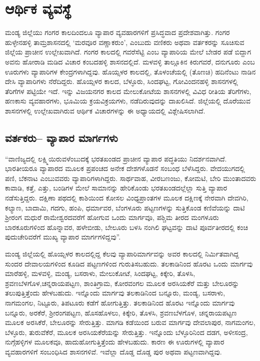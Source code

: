 
\chapter{ಆರ್ಥಿಕ ವ್ಯವಸ್ಥೆ}

ಮಂಡ್ಯ ಜಿಲ್ಲೆಯು ಗಂಗರ ಕಾಲದಿಂದಲೂ ವ್ಯಾಪಾರ ವ್ಯವಹಾರಗಳಿಗೆ ಪ್ರಸಿದ್ಧವಾದ ಪ್ರದೇಶವಾಗಿತ್ತು. ಗಂಗರ ಹುಳ್ಳೇನಹಳ್ಳಿ ತಾಮ್ರಶಾಸನದಲ್ಲಿ ‘ಮರವೂರ ವಣ್ಣಾಕರುಂ’, ಎಂಬುದು ವಣಿಕರು ಅಥವಾ ವರ್ತಕರನ್ನು ಸೂಚಿಸುವ ಜಿಲ್ಲೆಯ ಪ್ರಾಚೀನ ಉಲ್ಲೇಖವಾಗಿದೆ. ಗಂಗರ ಕಾಲದಲ್ಲಿ ಗವರೆಸೆಟ್ಟಿ ಎಂಬ ವ್ಯಾಪಾರಿಯ ಮೇಲೆ ಬೇಡರ ಪಡೆ ಬಿದ್ದಾಗ ಅವನು ಹೋರಾಡಿ ಮಡಿದ ವಿಚಾರ ಕಂಬದಹಳ್ಳಿ ಶಾಸನದಲ್ಲಿದೆ. ಮಳವಳ್ಳಿ ತಾಲ್ಲೂಕಿನ ಕಿರುಗವರೆ, ದನುಗೂರು ಎಂಬ ಊರುಗಳು ವ್ಯಾಪಾರಿಗಳ ಕೇಂದ್ರಗಳಾಗಿದ್ದವು. ಹೊಯ್ಸಳರ ಕಾಲದಲ್ಲಿ, ತೊಳಂಚೆಯಲ್ಲಿ (ತೊಣಚಿ) ಹದಿನೆಂಟು ನಾಡಿನ ದೇಸಿ ವ್ಯಾಪಾರಿಗಳು ನೆರೆದಿದ್ದರು. ಹೊಯ್ಸಳರ ಕಾಲದ, ಬೆಳ್ಳೂರು, ಸಿಂದಘಟ್ಟ, ಗೋವಿಂದನಹಳ್ಳಿ ಶಾಸನಗಳಲ್ಲಿ ತೆರಿಗೆಗಳ ಪಟ್ಟಿಯೇ ಇದೆ. ಇನ್ನು ವಿಜಯನಗರ ಕಾಲದ ಮೇಲುಕೋಟೆಯ ಶಾಸನಗಳಲ್ಲಿ ವಿವಿಧ ರೀತಿಯ ತೆರಿಗೆಗಳು, ಹಣಕಾಸು ವ್ಯವಹಾರಗಳು, ಭೂಮಿಯ ಕ್ರಯವಿಕ್ರಯಗಳು, ನಡೆದಿರುವುದನ್ನು ದಾಖಲಿಸಿದೆ. ಜಿಲ್ಲೆಯಲ್ಲಿ ದೊರೆಯುವ ಶಾಸನಗಳಲ್ಲಿ ಉಲ್ಲೇಖವಾಗಿರುವ ಆರ್ಥಿಕ ವಿಚಾರಗಳನ್ನು ಈ ಅಧ್ಯಾಯದಲ್ಲಿ ವಿಶ್ಲೇಷಿಸಲಾಗಿದೆ.

\section{ವರ್ತಕರು– ವ್ಯಾಪಾರ ಮಾರ್ಗಗಳು}

“ವಾಣಿಜ್ಯದಲ್ಲಿ ಲಕ್ಷ್ಮಿಯಿರುವಳೆಂಬುದಕ್ಕೆ ಭರತಖಂಡದ ಪ್ರಾಚೀನ ವ್ಯಾಪಾರ ಪದ್ಧತಿಯು ನಿದರ್ಶನವಾಗಿದೆ. ಭಾರತೀಯರೂ ವ್ಯಾಪಾರದ ಮೂಲಕ ಪ್ರಪಂಚದ ಅನೇಕ ದೇಶಗಳೊಡನೆ ಸಂಬಂಧ ಬೆಳೆಸಿದ್ದರು. ವೇದಯುಗದಲ್ಲಿ ಪಣಿ, ಬೆಕನಾಟ ಎಂಬುವವರು ವ್ಯಾಪಾರಿಗಳಾಗಿದ್ದರು. ಸಾರ್ಥವಾಹ, ವೀರಬಣಂಜು, ಕೋಮಟಿ, ಬೇರಿ ಮುಂತಾದವರು ಕಾವಾಡಿ, ಕತ್ತೆ, ಎತ್ತು, ಬಂಡಿಗಳ ಮೇಲೆ ಸಾಮಾನನ್ನು ಹೇರಿಕೊಂಡು ಭರತಖಂಡದಲ್ಲೆಲ್ಲಾ ಸುತ್ತಿ ವ್ಯಾಪಾರ ನಡೆಸುತ್ತಿದ್ದರು. ದಕ್ಷಿಣಾ ಪಥದಲ್ಲಿ ಕಾಶಿಯಿಂದ ಕೋಸಲ ವಿಂಧ್ಯಪ್ರಾಂತಗಳ ಮೂಲಕ ದಕ್ಷಿಣಕ್ಕೆ ನೇರವಾಗಿ ದೇವಗಿರಿ, ಕಲ್ಯಾಣ, ಬಾದಾಮಿ, ಗದಗು, ಹಂಪಿ, ಧರ್ಮಾವರ, ಬೆಂಗಳೂರು ಪಟ್ಟಣಗಳನ್ನು ಸುತ್ತಿಕೊಂಡ ಕಣಿವೆಯನ್ನು ದಾಟಿ ಶ‍್ರೀರಂಗ ಮಧುರೆ ರಾಮೇಶ್ವರದವರೆಗೆ ಹೋಗುವ ಒಂದು ಮಾರ್ಗವೂ, ಪಶ್ಚಿಮ ತೀರದ ಮಂಗಳೂರು ಬಾರಕೂರುಗಳಿಂದ ಹೊನ್ನಾವರ, ಹಳೇಬೀಡು, ಬೇಲೂರು ಬಳಸಿ ನಂಗಿಲಿ ಘಟ್ಟವನ್ನು ದಾಟಿ ಪೂರ್ವತೀರದಲ್ಲಿ ಕಂಚಿ ಪುದುಚೇರಿವರೆಗೆ ಮುಖ್ಯ ವ್ಯಾಪಾರ ಮಾರ್ಗಗಳಿದ್ದವು”.

ಮಂಡ್ಯ ಜಿಲ್ಲೆಯಲ್ಲಿ ಹೊಯ್ಸಳರ ಕಾಲದಲ್ಲಿದ್ದ ಕೆಲವು ವ್ಯಾಪಾರಿಮಾರ್ಗವನ್ನು ಅವರ ಕಾಲದಲ್ಲಿ ನಿರ್ಮಿತವಾಗಿದ್ದ ಸುಂದರ ದೇವಾಲಯಗಳಿಂದ ಕೂಡಿದ ಪಟ್ಟಣಗಳಿಂದ ಗುರುತಿಸಬಹುದು. ತಲಕಾಡಿನಿಂದ ಹೊರಟ ಒಂದು ಮಾರ್ಗವು ಮಾರೆಹಳ್ಳಿ, ಮಳವಳ್ಳಿ, ಮಂಡ್ಯ, ಬಸರಾಳು, ಮೇಲುಕೋಟೆ, ಸಿಂದಘಟ್ಟ, ಕಿಕ್ಕೇರಿ, ತೊಳಸಿ, ಶ್ರವಣಬೆಳಗೊಳ,\break ಚನ್ನರಾಯಪಟ್ಟಣ, ಶಾಂತಿಗ್ರಾಮ, ಕೋರವಂಗಲ ಮೂಲಕ ಅರಸಿಯಕೆರೆ ಮತ್ತು ಬೇಲೂರನ್ನು ತಲುಪುತ್ತಿತ್ತೆಂದು ಹೇಳಬಹುದು. ಇನ್ನೊಂದು ಮಾರ್ಗವು ತಲಕಾಡಿನಿಂದ ಬನ್ನೂರು, ಮಂಡ್ಯ, ಬಸರಾಳು, ನಾಗಮಂಗಲ, ನಿಟ್ಟೂರು, ತಿಪಟೂರು ಕಡೆಗೆ ಹೋಗುತ್ತಿತ್ತು. ತಲಕಾಡಿನಿಂದ ಹೊರಟ ಇನ್ನೊಂದು ಮಾರ್ಗವು ಬನ್ನೂರು, ಅರಕೆರೆ, ಶ‍್ರೀರಂಗಪಟ್ಟಣ, ಹೊಸಹೊಳಲು, ಕಿಕ್ಕೇರಿ, ತೊಳಸಿ, ಶ್ರವಣಬೆಳಗೊಳ, ಚನ್ನರಾಯಪಟ್ಟಣ ಮೂಲಕ ಅರಸಿಕೆರೆ, ಬೇಲೂರನ್ನು ಸೇರುತ್ತಿತ್ತು. ಮಾಗಡಿ ಕಡೆಯಿಂದ ಬರುವ ಮಾರ್ಗವು ದೇವಲಾಪುರ, ನಾಗಮಂಗಲ, ಬೆಳ್ಳೂರು, ತುರುವೆಕೆರೆ, ಮೂಲಕ ಅರಸಿಯಕೆರೆಯನ್ನು ಸೇರುತ್ತಿತ್ತು. ಇನ್ನೊಂದು ಬೆಳ್ಳೂರಿನಿಂದ ದಡಗ, ಅಳೀಸಂದ್ರ, ನುಗ್ಗೆಹಳ್ಳಿಗಳ ಮೂಲಕವೂ, ಹಾದುಹೋಗುತ್ತಿತ್ತೆಂದು ಹೇಳಬಹುದು. ಕಾರಣ ಈ ಊರುಗಳಲ್ಲಿ ವ್ಯಾಪಾರ ವ್ಯವಹಾರಗಳಿಗೆ ಸಂಬಂಧಿಸಿದ ಶಾಸನಗಳಿವೆ. ಇವೆಲ್ಲಾ ದೊಡ್ಡ ದೊಡ್ಡ ಪುರ ಅಥವಾ ಪಟ್ಟಣವಾಗಿದ್ದವು.

